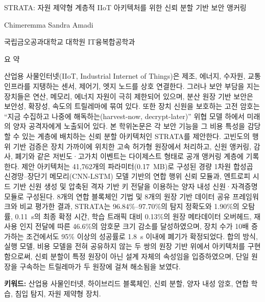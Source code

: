
\begin{titlepage}
\begin{center}
\LARGE
STRATA: 자원 제약형 계층적 IIoT 아키텍처를 위한 신뢰 분할 기반 보안 앵커링

\vspace{0.8cm}
\LARGE
Chimeremma Sandra Amadi

\vspace{0.8cm}
\LARGE
국립금오공과대학교 대학원 IT융복합공학과

\vspace{0.8cm}
\LARGE
요    약
\end{center}
\large
{}
산업용 사물인터넷(IIoT, Industrial Internet of Things)은 제조, 에너지, 수자원, 교통 인프라를 지탱하는 센서, 제어기, 엣지 노드를 상호 연결한다. 그러나 보안 부담을 지는 장치들은 연산, 메모리, 에너지 자원이 극히 제한되어 있으며, 분산 원장 기반 보안은 보안성, 확장성, 속도의 트릴레마에 묶여 있다. 또한 장치 신원을 보호하는 고전 암호는 ``지금 수집하고 나중에 해독하는(harvest-now, decrypt-later)'' 위협 모델 하에서 미래의 양자 공격자에게 노출되어 있다. 본 학위논문은 각 보안 기능을 그 비용 특성을 감당할 수 있는 계층에 배치하는 신뢰 분할 아키텍처인 STRATA를 제안한다. 고빈도의 행위 기반 검증은 장치 가까이에 위치한 고속 허가형 원장에서 처리하고, 신원 앵커링, 감사, 폐기와 같은 저빈도·고가치 이벤트는 다이제스트 형태로 공개 앵커링 계층에 기록한다. 제안 아키텍처는 41{,}762개의 파라미터(0.17~MB)로 구성된 경량 1차원 합성곱 신경망--장단기 메모리(CNN-LSTM) 모델 기반의 연합 행위 신뢰 모듈과, 엔트로피 시드 기반 신원 생성 및 압축된 격자 기반 키 전달을 이용하는 양자 내성 신원·자격증명 모듈로 구성된다. 8개의 연합 블록체인 기법 및 8개의 원장 기반 데이터 공유 프레임워크와 비교 평가한 결과, STRATA는 96.84\%--97.70\%의 탐지 정확도와 1.90\%의 오탐률, 0.11~s의 최종 확정 시간, 학습 트래픽 대비 0.13\%의 원장 메타데이터 오버헤드, 재사용 인지 전달에 따른 46.6\%의 암호문 크기 감소를 달성하였으며, 장치 수가 10배 증가하는 조건에서도 95\% 이상의 성공률로 1.8~s 이내에 폐기가 확정되었다. 합의 방식, 실행 모델, 비용 모델을 전혀 공유하지 않는 두 쌍의 원장 기반 위에서 아키텍처를 구현함으로써, 신뢰 분할이 특정 원장이 아닌 설계 자체의 속성임을 입증하였으며, 단일 원장을 구속하는 트릴레마가 두 원장에 걸쳐 해소됨을 보였다.

\vspace{0.5cm}
\textbf{키워드:} 산업용 사물인터넷, 하이브리드 블록체인, 신뢰 분할, 양자 내성 암호, 연합 학습, 침입 탐지, 자원 제약형 장치.
\end{titlepage}
